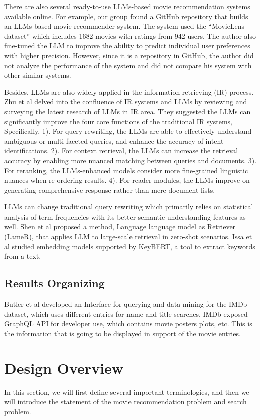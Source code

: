 \documentclass[journal]{IEEEtran}
\theoremstyle{mydefstyle}
\begin{document}
There are also several ready-to-use LLMs-based movie recommendation systems available online. For example, our group found a GitHub repository that builds an LLMs-based movie recommender system\cite{GitHub}. The system used the “MovieLens dataset” which includes 1682 movies with ratings from 942 users. The author also fine-tuned the LLM to improve the ability to predict individual user preferences with higher precision. However, since it is a repository in GitHub, the author did not analyze the performance of the system and did not compare his system with other similar systems.

Besides, LLMs are also widely applied in the information retrieving (IR) process. Zhu et al\cite{LLM4IRSurvey} delved into the confluence of IR systems and LLMs by reviewing and surveying the latest research of LLMs in IR area. They suggested the LLMs can significantly improve the four core functions of the traditional IR systems, Specifically, 1). For query rewriting, the LLMs are able to effectively understand ambiguous or multi-faceted queries, and enhance the accuracy of intent identifications. 2). For context retrieval, the LLMs can increase the retrieval accuracy by enabling more nuanced matching between queries and documents. 3). For reranking, the LLMs-enhanced models consider more fine-grained linguistic nuances when re-ordering results. 4). For reader modules, the LLMs improve on generating comprehensive response rather than mere document lists.

LLMs can change traditional query rewriting which primarily relies on statistical analysis of term frequencies with its better semantic understanding features as well. Shen et al\cite{RN11} proposed a method, Language language model as Retriever (LameR), that applies LLM to large-scale retrieval in zero-shot scenarios. Issa et al\cite{10295108} studied embedding models supported by KeyBERT, a tool to extract keywords from a text.

\subsection{Results Organizing}
Butler et al\cite{7494103} developed an Interface for querying and data mining for the IMDb dataset, which uses different entries for name and title searches. IMDb\cite{IMDb} exposed GraphQL API for developer use, which contains movie posters plots, etc. This is the information that is going to be displayed in support of the movie entries.

\section{Design Overview}
In this section, we will first define several important terminologies, and then we will introduce the statement of the movie recommendation problem and search problem.
\end{document}
